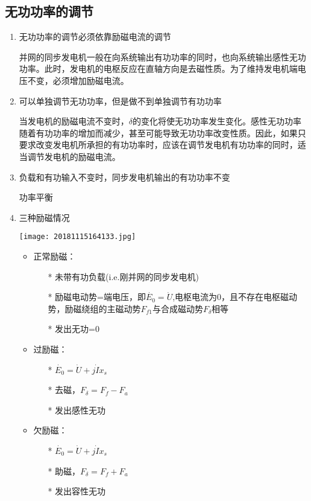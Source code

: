 \documentclass[blue]{elegantnote}
\begin{document}
\subsection{无功功率的调节}
\begin{enumerate}
	\item 无功功率的调节必须依靠励磁电流的调节
	\begin{note}	
	并网的同步发电机一般在向系统输出{\color{thid}有功功率}的同时，也向系统输出{\color{thid}感性无功功率。}此时，发电机的电枢反应在直轴方向是{\color{thid}去磁性质}。为了维持发电机端电压不变，必须增加励磁电流。
	\end{note}	
	\item 可以单独调节无功功率，但是做不到单独调节有功功率
	\begin{note}
	当发电机的励磁电流不变时，$\delta$的变化将使无功功率发生变化。感性无功功率随着有功功率的增加而减少，甚至可能导致无功功率改变性质。因此，如果只要求改变发电机所承担的有功功率时，应该在调节发电机有功功率的同时，适当调节发电机的励磁电流。
	\end{note}
	\item	负载和有功输入不变时，同步发电机输出的有功功率不变
	\begin{note}
		功率平衡
	\end{note}
	\item	三种励磁情况
	\begin{center}
		\texttt{[image: 20181115164133.jpg]}
	\end{center}
	\begin{itemize}
		\item 正常励磁：
		\begin{itemize}
			\item [*]未带有功负载(i.e.刚并网的同步发电机)
			\item [*] 励磁电动势=端电压，即$\dot{E_{0}}=\dot{U}$,电枢电流为0，且不存在电枢磁动势，励磁绕组的主磁动势$F_{f1}$与合成磁动势$F_{\delta}$相等
			\item [*] 发出无功=0	
		\end{itemize}
		\item 过励磁：
		\begin{itemize}
			\item[*]  $\dot{E_{0}}=\dot{U}+j\dot{I}x_s$
			\item[*] 去磁，$F_{\delta}=F_{f}-F_{a}$	
			\item[*] 发出感性无功
		\end{itemize}
		\item 欠励磁：
		\begin{itemize}
			\item[*]  $\dot{E_{0}}=\dot{U}+j\dot{I}x_s$
			\item[*] 助磁，$F_{\delta}=F_{f}+F_{a}$	
			\item[*] 发出容性无功
		\end{itemize}
	\end{itemize}
\end{enumerate}
\end{document}
